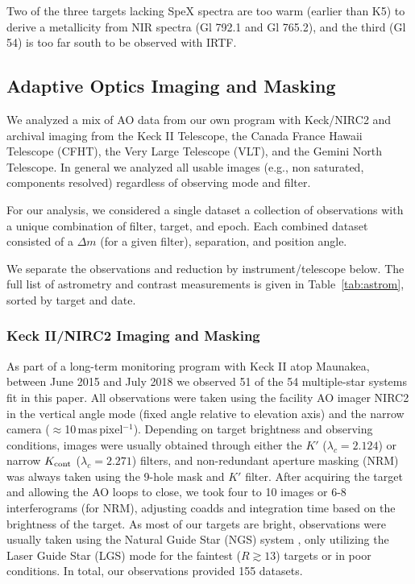 \documentclass[twocolumn]{aastex62}
\begin{document}
Two of the three targets lacking SpeX spectra are too warm (earlier than K5) to derive a metallicity from NIR spectra (Gl 792.1 and Gl 765.2), and the third (Gl 54) is too far south to be observed with IRTF. 

\subsection{Adaptive Optics Imaging and Masking}\label{sec:ao}

We analyzed a mix of AO data from our own program with Keck/NIRC2 and archival imaging from the Keck II Telescope, the Canada France Hawaii Telescope (CFHT), the Very Large Telescope (VLT), and the Gemini North Telescope. In general we analyzed all usable images (e.g., non saturated, components resolved) regardless of observing mode and filter. 

For our analysis, we considered a single dataset a collection of observations with a unique combination of filter, target, and epoch. Each combined dataset consisted of a $\Delta m$ (for a given filter), separation, and position angle. 

We separate the observations and reduction by instrument/telescope below. The full list of astrometry and contrast measurements is given in Table~\ref{tab:astrom}, sorted by target and date. 

\subsubsection{Keck II/NIRC2 Imaging and Masking}
As part of a long-term monitoring program with Keck II atop Maunakea, between June 2015 and July 2018 we observed 51 of the 54 multiple-star systems fit in this paper. %
All observations were taken using the facility AO imager NIRC2 in the vertical angle mode (fixed angle relative to elevation axis) and the narrow camera ($\approx$10\,mas\,pixel$^{-1}$). Depending on target brightness and observing conditions, images were usually obtained through either the $K'$ ($\lambda_c=2.124$\um) or narrow $K_{\rm{cont}}$ ($\lambda_c=2.271$\um) filters, and non-redundant aperture masking (NRM) was always taken using the 9-hole mask and $K'$ filter. After acquiring the target and allowing the AO loops to close, we took four to 10 images or 6-8 interferograms (for NRM), adjusting coadds and integration time based on the brightness of the target. As most of our targets are bright, observations were usually taken using the Natural Guide Star (NGS) system \citep{2000PASP..112..315W,2004ApOpt..43.5458V}, only utilizing the Laser Guide Star (LGS) mode for the faintest ($R\gtrsim13$) targets or in poor conditions. In total, our observations provided 155 datasets.%
\end{document}
